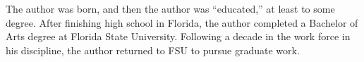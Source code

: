 \documentclass[11pt,copyright,expanded]{fsuthesis}
\begin{document}






\begin{biosketch}
The author was born, and then the author was ``educated,'' at least to
some degree.  After finishing high school in Florida, the author
completed a Bachelor of Arts degree at Florida State University.
Following a decade in the work force in his discipline, the author
returned to FSU to pursue graduate work.
\end{biosketch}

\end{document}
